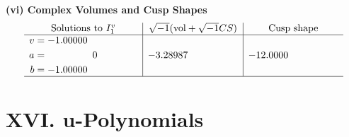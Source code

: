 \documentclass[1p]{elsarticle_modified}
\theoremstyle{definition}
\newcommand{\I}{\sqrt{-1}}
\begin{document}
\newpage\flushleft \textbf{(vi) Complex Volumes and Cusp Shapes}
$$\begin{array}{c|c|c}  
\text{Solutions to }I^v_{1}& \I (\text{vol} + \sqrt{-1}CS) & \text{Cusp shape}\\
 \hline 
\begin{aligned}
v &= -1.00000\phantom{ +0.000000I} \\
a &= \phantom{-0.000000 } 0 \\
b &= -1.00000\phantom{ +0.000000I}\end{aligned}
 & -3.28987\phantom{ +0.000000I} & -12.0000\phantom{ +0.000000I}\\
 \hline 
 \end{array}$$\newpage
\newpage\renewcommand{\arraystretch}{1}
\centering \section*{ XVI. u-Polynomials}
\end{document}
